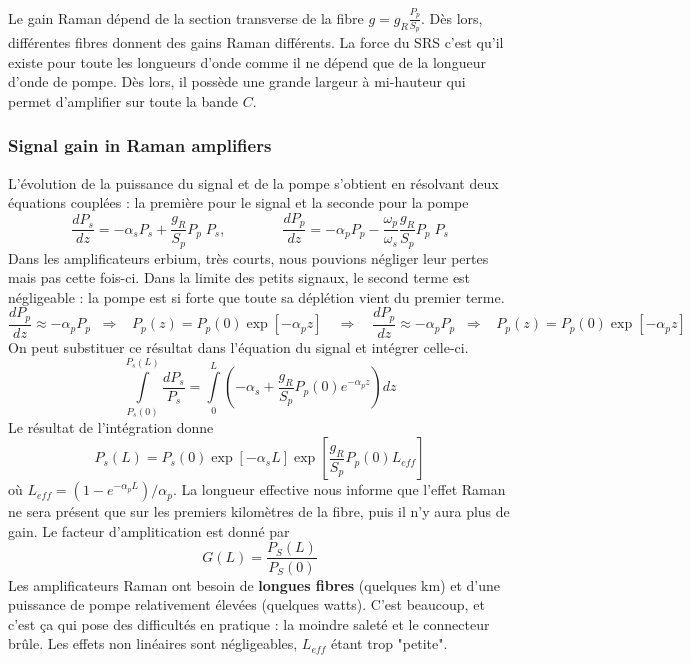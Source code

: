 Le gain Raman dépend de la section transverse de la fibre $g = {g_R}\frac{{{P_p}}}{{{S_p}}}$. Dès lors, 
différentes fibres donnent des gains Raman différents. La force du SRS c'est qu'il existe pour toute les 
longueurs d'onde comme il ne dépend que de la longueur d'onde de pompe. Dès lors, il possède une grande 
largeur à mi-hauteur qui permet d'amplifier sur toute la bande $C$.

\subsubsection{Signal gain in Raman amplifiers}
L'évolution de la puissance du signal et de la pompe s'obtient en résolvant deux équations couplées : la première
pour le signal et la seconde pour la pompe
\begin{equation}
\frac{{d{P_s}}}{{dz}} =  - {\alpha _s}{P_s} + \frac{{{g_R}}}{{{S_p}}}{P_p}\;{P_s},\qquad\qquad
\frac{{d{P_p}}}{{dz}} =  - {\alpha _p}{P_p} - \frac{{{\omega _p}}}{{{\omega _s}}}\frac{{{g_R}}}{{{S_p}}}{P_p}\;{P_s}
\end{equation}
Dans les amplificateurs erbium, très courts, nous pouvions négliger leur pertes mais pas cette fois-ci. Dans 
la limite des petits signaux, le second terme est négligeable : la pompe est si forte que toute sa déplétion 
vient du premier terme. 
\begin{equation}
\frac{{d{P_p}}}{{dz}} \approx  - {\alpha _p}{P_p}\;\; \Rightarrow \;\;\;{P_p}(z) = {P_p}(0)\exp [ - {\alpha _p}z]
\quad\Rightarrow\quad
\frac{{d{P_p}}}{{dz}} \approx  - {\alpha _p}{P_p}\;\; \Rightarrow \;\;\;{P_p}(z) = {P_p}(0)\exp [ - {\alpha _p}z]
\end{equation}
On peut substituer ce résultat dans l'équation du signal et intégrer celle-ci.
\begin{equation}
\int\limits_{{P_s}(0)}^{{P_s}(L)} {\frac{{d{P_s}}}{{{P_s}}}}  = \int\limits_0^L {( - {\alpha _s} + \frac{{{g_R}}}{{{S_p}}}{P_p}(0){e^{ - {\alpha _p}z}})dz} 
\end{equation}
Le résultat de l'intégration donne
\begin{equation}
{P_s}(L) = {P_s}(0)\exp [ - {\alpha _s}L]\exp [\frac{{{g_R}}}{{{S_p}}}{P_p}(0){L_{eff}}]
\end{equation}
où ${L_{eff}} = (1 - {e^{ - {\alpha _p}L}})/{\alpha _p}$. La longueur effective nous informe que l'effet Raman
ne sera présent que sur les premiers kilomètres de la fibre, puis il n'y aura plus de gain. Le facteur
d'amplitication est donné par
\begin{equation}
G(L) = \dfrac{P_S(L)}{P_S(0)}
\end{equation}
Les amplificateurs Raman ont besoin de \textbf{longues fibres} (quelques km) et d'une puissance de pompe
relativement élevées (quelques watts). C'est beaucoup, et c'est ça qui pose des difficultés en pratique : la 
moindre saleté et le connecteur brûle. Les effets non linéaires sont négligeables, $L_{eff}$ étant trop 
"petite". 

